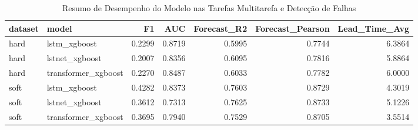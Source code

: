 \begin{table}
\caption{Resumo de Desempenho do Modelo nas Tarefas Multitarefa e Detecção de Falhas}
\label{tab:full_results}
\begin{tabular}{llrrrrr}
\toprule
dataset & model & F1 & AUC & Forecast_R2 & Forecast_Pearson & Lead_Time_Avg \\
\midrule
hard & lstm_xgboost & 0.2299 & 0.8719 & 0.5995 & 0.7744 & 6.3864 \\
hard & lstnet_xgboost & 0.2007 & 0.8356 & 0.6095 & 0.7816 & 5.8864 \\
hard & transformer_xgboost & 0.2270 & 0.8487 & 0.6033 & 0.7782 & 6.0000 \\
soft & lstm_xgboost & 0.4282 & 0.8373 & 0.7603 & 0.8729 & 4.3019 \\
soft & lstnet_xgboost & 0.3612 & 0.7313 & 0.7625 & 0.8733 & 5.1226 \\
soft & transformer_xgboost & 0.3695 & 0.7940 & 0.7529 & 0.8705 & 3.5514 \\
\bottomrule
\end{tabular}
\end{table}
